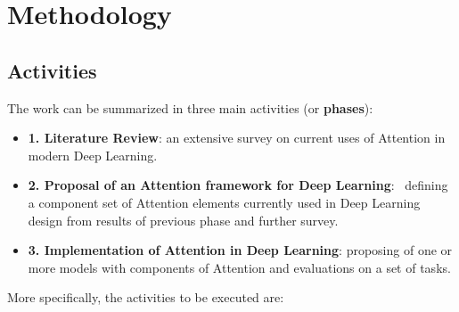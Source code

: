 \documentclass[12pt]{article}
\begin{document}
\let\clearpage\relax

\section{Methodology}
\subsection{Activities}
\label{sec:activities}
The work can be summarized in three main activities (or \textbf{phases}):
\begin{itemize}
    \item \textbf{1. Literature Review}: an extensive survey on current uses of Attention in modern
        Deep Learning.
    \item \textbf{2. Proposal of an Attention framework for Deep Learning}: \
        defining a component set of Attention elements currently used in Deep Learning design from results of previous phase and further survey.
    \item \textbf{3. Implementation of Attention in Deep Learning}:
        proposing of one or more models with components of Attention and evaluations on a set of tasks.
\end{itemize}

More specifically, the activities to be executed are:
\end{document}
